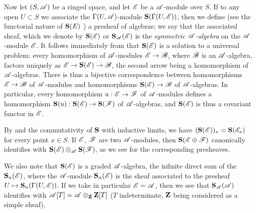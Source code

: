 \begin{env}[1.7.4]
\label{II.1.7.4}
Now let $(S,\mathscr{A})$ be a ringed space, and let $\mathscr{E}$ be a $\mathscr{A}$-module over $S$.
If to any open $U\subset S$ we associate the $\Gamma(U,\mathscr{A})$-module $\mathbf{S}(\Gamma(U,\mathscr{E}))$, then we define (see the functorial nature of $\mathbf{S}(E)$ ) a presheaf of algebras; we say that the associated sheaf, which we denote by $\mathbf{S}(\mathscr{E})$ or $\mathbf{S}_\mathscr{A}(\mathscr{E})$ is the \emph{symmetric $\mathscr{A}$-algebra} on the $\mathscr{A}$-module $\mathscr{E}$.
It follows immediately from  that $\mathbf{S}(\mathscr{E})$ is a solution to a universal problem: every homomorphism of $\mathscr{A}$-modules $\sh{E}\to\sh{B}$, where $\mathscr{B}$ is an $\mathscr{A}$-algebra, factors uniquely as $\sh{E}\to\bb{S}(\sh{E})\to\sh{B}$, the second arrow being a homomorphism of $\mathscr{A}$-algebras.
There is thus a bijective correspondence between homomorphisms $\sh{E}\to\sh{B}$ of $\mathscr{A}$-modules and homomorphisms $\bb{S}(\sh{E})\to\sh{B}$ of $\mathscr{A}$-algebras.
In particular, every homomorphism $u:\sh{E}\to\sh{F}$ of $\mathscr{A}$-modules defines a homomorphism $\bb{S}(u):\bb{S}(\sh{E})\to\bb{S}(\sh{F})$ of $\mathscr{A}$-algebras, and $\mathbf{S}(\mathscr{E})$ is thus a covariant functor in $\mathscr{E}$.

By  and the commutativity of $\mathbf{S}$ with inductive limits, we have $(\mathbf{S}(\mathscr{E}))_x=\mathbf{S}(\mathscr{E}_x)$ for every point $x\in S$.
If $\mathscr{E}$, $\mathscr{F}$ are two $\mathscr{A}$-modules, then $\mathbf{S}(\mathscr{E}\oplus\mathscr{F})$ canonically identifies with $\mathbf{S}(\mathscr{E})\otimes_\mathscr{A}\mathbf{S}(\mathscr{F})$, as we see for the corresponding presheaves.

We also note that $\mathbf{S}(\mathscr{E})$ is a graded $\mathscr{A}$-algebra, the infinite direct sum of the $\mathbf{S}_n(\mathscr{E})$, where the $\mathscr{A}$-module $\mathbf{S}_n(\mathscr{E})$ is the sheaf associated to the presheaf $U\mapsto\bb{S}_n(\Gamma(U,\sh{E}))$.
If we take in particular $\mathscr{E}=\mathscr{A}$, then we see that $\mathbf{S}_\mathscr{A}(\mathscr{A})$ identifies with $\mathscr{A}[T]=\mathscr{A}\otimes_\mathbf{Z}\mathbf{Z}[T]$ ($T$ indeterminate, $\mathbf{Z}$ being considered as a simple sheaf).
\end{env}

